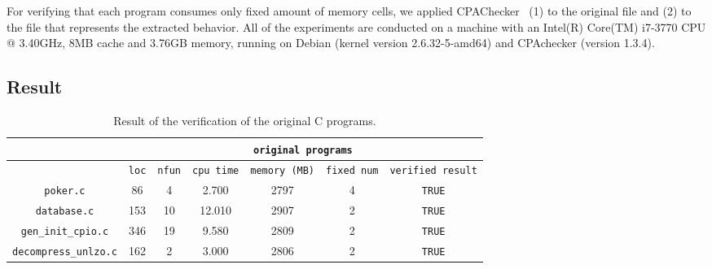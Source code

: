 For verifying that each program consumes only fixed amount of memory
cells, we applied CPAChecker~\cite{beyer2011cpachecker} (1) to the
original file and (2) to the file that represents the extracted
behavior.  All of the experiments are conducted on a machine with an
Intel(R) Core(TM) i7-3770 CPU @ 3.40GHz, 8MB cache and 3.76GB memory,
running on Debian (kernel version 2.6.32-5-amd64) and CPAchecker
(version 1.3.4).


\subsection{Result}

\begin{table}
  \scriptsize
\begin{tabular}{|c|c|c|c|c|c|c|}
\hline
& \multicolumn{6}{|c|}{\texttt{original programs}}  \\
\hline
& \texttt{loc} & \texttt{nfun} & \texttt{cpu time} & \texttt{memory (MB)} & \texttt{fixed num}& \texttt{verified result} \\
\hline
\texttt{poker.c} & 86 & 4 & 2.700 & 2797 & 4  & \texttt{TRUE}  \\
\hline
\texttt{database.c} & 153 & 10 & 12.010 & 2907 & 2  & \texttt{TRUE}  \\
\hline
\texttt{gen\_init\_cpio.c} & 346 & 19 & 9.580 & 2809 & 2  & \texttt{TRUE}  \\
\hline
\texttt{decompress\_unlzo.c} & 162 & 2  & 3.000  & 2806  & 2  & \texttt{TRUE}  \\
\hline
\end{tabular}
\caption{Result of the verification of the original C programs.}
\label{tb:mcc}
\end{table}

